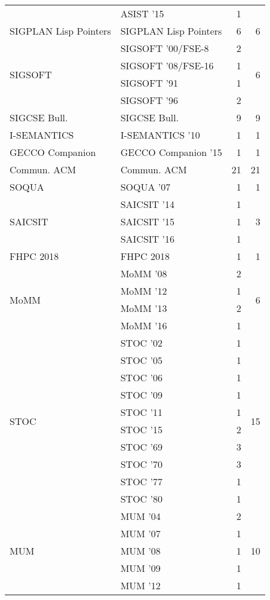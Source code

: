 \begin{table*}[t]
\begin{tabular}{llrr}
& ASIST '15 & 1 &\\
\multirow{1}{*}{SIGPLAN Lisp Pointers} & SIGPLAN Lisp Pointers & 6 & \multirow{1}{*}{6}\\
\multirow{4}{*}{SIGSOFT } & SIGSOFT '00/FSE-8 & 2 & \multirow{4}{*}{6}\\
& SIGSOFT '08/FSE-16 & 1 &\\
& SIGSOFT '91 & 1 &\\
& SIGSOFT '96 & 2 &\\
\multirow{1}{*}{SIGCSE Bull.} & SIGCSE Bull. & 9 & \multirow{1}{*}{9}\\
\multirow{1}{*}{I-SEMANTICS } & I-SEMANTICS '10 & 1 & \multirow{1}{*}{1}\\
\multirow{1}{*}{GECCO Companion } & GECCO Companion '15 & 1 & \multirow{1}{*}{1}\\
\multirow{1}{*}{Commun. ACM} & Commun. ACM & 21 & \multirow{1}{*}{21}\\
\multirow{1}{*}{SOQUA } & SOQUA '07 & 1 & \multirow{1}{*}{1}\\
\multirow{3}{*}{SAICSIT } & SAICSIT '14 & 1 & \multirow{3}{*}{3}\\
& SAICSIT '15 & 1 &\\
& SAICSIT '16 & 1 &\\
\multirow{1}{*}{FHPC 2018} & FHPC 2018 & 1 & \multirow{1}{*}{1}\\
\multirow{4}{*}{MoMM } & MoMM '08 & 2 & \multirow{4}{*}{6}\\
& MoMM '12 & 1 &\\
& MoMM '13 & 2 &\\
& MoMM '16 & 1 &\\
\multirow{10}{*}{STOC } & STOC '02 & 1 & \multirow{10}{*}{15}\\
& STOC '05 & 1 &\\
& STOC '06 & 1 &\\
& STOC '09 & 1 &\\
& STOC '11 & 1 &\\
& STOC '15 & 2 &\\
& STOC '69 & 3 &\\
& STOC '70 & 3 &\\
& STOC '77 & 1 &\\
& STOC '80 & 1 &\\
\multirow{7}{*}{MUM } & MUM '04 & 2 & \multirow{7}{*}{10}\\
& MUM '07 & 1 &\\
& MUM '08 & 1 &\\
& MUM '09 & 1 &\\
& MUM '12 & 1 &\\

\end{tabular}
\end{table*}
